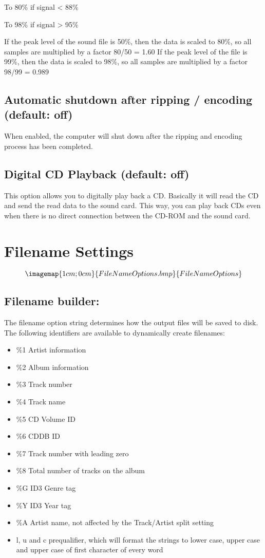To 80\% if signal < 88\%

To 98\% if signal > 95\%

If the peak level of the sound file is 50\%, then the data is scaled to 80\%, so 
all samples are multiplied by a factor 80/50 = 1.60
If the peak level of the file is 99\%, then the data is scaled to 98\%, so all samples are 
multiplied by a factor 98/99 = 0.989


\subsection{Automatic shutdown after ripping / encoding (default: off)}
When enabled, the computer will shut down after the ripping and encoding process
has been completed.

\subsection{Digital CD Playback (default: off)}
This option allows you to digitally play back a CD.  Basically it will read the CD and
send the read data to the sound card.  This way, you can play back CDs even when there
is no direct connection between the CD-ROM and the sound card.


\section{Filename Settings}

$$\imagemap{1cm;0cm}{FileNameOptions.bmp}{FileNameOptions}$$

\subsection{Filename builder:}

The filename option string determines how the output files will be saved to
disk. The following identifiers are available to dynamically create filenames:

\begin{itemize}
\itemsep=0pt
\item \%1 Artist information
\item \%2 Album information
\item \%3 Track number
\item \%4 Track name
\item \%5 CD Volume ID
\item \%6 CDDB ID
\item \%7 Track number with leading zero
\item \%8 Total number of tracks on the album
\item \%G ID3 Genre tag
\item \%Y ID3 Year tag
\item \%A Artist name, not affected by the Track/Artist split setting
\item l, u and c prequalifier, which will format the strings to lower case, upper case and 
upper case of first character of every word
\end{itemize}


